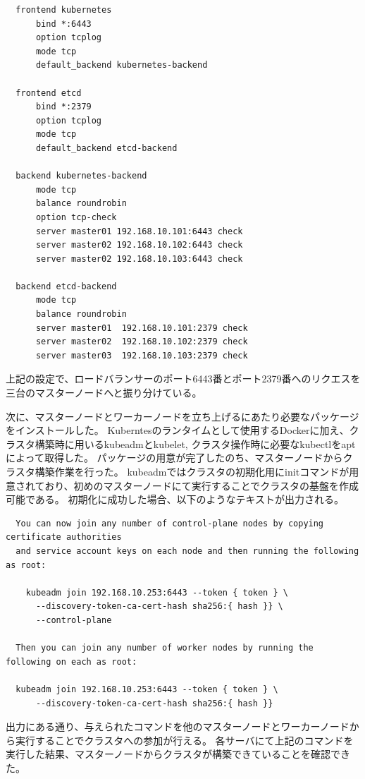 \begin{lstlisting}
  frontend kubernetes
      bind *:6443
      option tcplog
      mode tcp
      default_backend kubernetes-backend

  frontend etcd
      bind *:2379
      option tcplog
      mode tcp
      default_backend etcd-backend

  backend kubernetes-backend
      mode tcp
      balance roundrobin
      option tcp-check
      server master01 192.168.10.101:6443 check
      server master02 192.168.10.102:6443 check
      server master02 192.168.10.103:6443 check

  backend etcd-backend
      mode tcp
      balance roundrobin
      server master01  192.168.10.101:2379 check
      server master02  192.168.10.102:2379 check
      server master03  192.168.10.103:2379 check
\end{lstlisting}

上記の設定で、ロードバランサーのポート6443番とポート2379番へのリクエスを三台のマスターノードへと振り分けている。

次に、マスターノードとワーカーノードを立ち上げるにあたり必要なパッケージをインストールした。
Kuberntesのランタイムとして使用するDockerに加え、クラスタ構築時に用いるkubeadmとkubelet, クラスタ操作時に必要なkubectlをaptによって取得した。
パッケージの用意が完了したのち、マスターノードからクラスタ構築作業を行った。
kubeadmではクラスタの初期化用にinitコマンドが用意されており、初めのマスターノードにて実行することでクラスタの基盤を作成可能である。
初期化に成功した場合、以下のようなテキストが出力される。\\

\begin{lstlisting}
  You can now join any number of control-plane nodes by copying certificate authorities
  and service account keys on each node and then running the following as root:

    kubeadm join 192.168.10.253:6443 --token { token } \
      --discovery-token-ca-cert-hash sha256:{ hash }} \
      --control-plane

  Then you can join any number of worker nodes by running the following on each as root:

  kubeadm join 192.168.10.253:6443 --token { token } \
      --discovery-token-ca-cert-hash sha256:{ hash }}
\end{lstlisting}

出力にある通り、与えられたコマンドを他のマスターノードとワーカーノードから実行することでクラスタへの参加が行える。
各サーバにて上記のコマンドを実行した結果、マスターノードからクラスタが構築できていることを確認できた。

